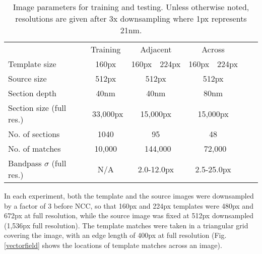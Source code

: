 \documentclass{article}
\begin{document}
\begin{table}[h]
    \caption{Image parameters for training and testing. Unless otherwise noted, resolutions are given after 3x downsampling where 1px represents 21nm.}
    \centering
     \small
    \begin{tabular}{l*{6}{c}r}
    
        \toprule
        & \multicolumn{1}{c}{Training} & \multicolumn{2}{c}{Adjacent}   &  \multicolumn{2}{c}{Across}\\
        \cmidrule{2-6}
        
        Template size   & 160px & 160px & 224px & 160px & 224px \\
        Source size     & 512px &\multicolumn{2}{c}{512px} &\multicolumn{2}{c}{512px} \\
        Section depth   & 40nm &\multicolumn{2}{c}{40nm} &\multicolumn{2}{c}{80nm} \\
        \cmidrule{2-6}
        Section size (full res.)    & ~33,000px & \multicolumn{2}{c}{15,000px} & \multicolumn{2}{c}{15,000px} \\
        No. of sections & 1040 & \multicolumn{2}{c}{95} & \multicolumn{2}{c}{48}\\
        No. of matches & 10,000 & \multicolumn{2}{c}{~144,000} & \multicolumn{2}{c}{~72,000}\\
        \cmidrule{2-6}
        Bandpass $\sigma$ (full res.) & N/A & \multicolumn{2}{c}{2.0-12.0px} & \multicolumn{2}{c}{2.5-25.0px}\\
       
        \bottomrule
    \end{tabular}
\label{table:parameters}
\end{table}


In each experiment, both the template and the source images were downsampled by a factor of 3 before NCC, so that 160px and 224px templates were 480px and 672px at full resolution, while the source image was fixed at 512px downsampled (1,536px full resolution). The template matches were taken in a triangular grid covering the image, with an edge length of 400px at full resolution (Fig. \ref{vectorfield} shows the locations of template matches across an image).
\end{document}

